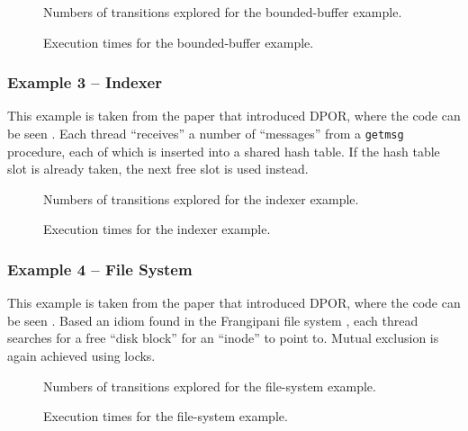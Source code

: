 \documentclass[12pt,a4paper,twoside,openright]{report}
\begin{document}
\begin{figure}
	\centering

	\def\svgwidth{\textwidth}
	
	\caption{Numbers of transitions explored
		for the bounded-buffer example.}
	\label{fig:prod-cons-time}
	\def\svgwidth{\textwidth}
	
	\caption{Execution times for the
		bounded-buffer example.}
	\label{fig:prod-cons-trans}
\end{figure}

\subsubsection{Example 3 -- Indexer}
This example is taken from
the paper that introduced DPOR,
where the code can be seen \cite[Figure~1]{flan05}.
Each thread ``receives'' a number of
``messages'' from a \texttt{getmsg}
procedure, each of which is inserted
into a shared hash table. If the
hash table slot is already taken, the
next free slot is used instead.

\begin{figure}
	\centering

	\def\svgwidth{\textwidth}
	
	\caption{Numbers of transitions explored
		for the indexer example.}
	\label{fig:indexer-trans}

	\def\svgwidth{\textwidth}
	
	\caption{Execution times
		for the indexer example.}
	\label{fig:indexer-time}
\end{figure}

\subsubsection{Example 4 -- File System}
This example is taken from
the paper that introduced DPOR,
where the code can be seen \cite[Figure~7]{flan05}.
Based an idiom found in the Frangipani file
system \cite{thek97}, each thread searches for a free
``disk block'' for an ``inode'' to point
to. Mutual exclusion is again achieved using
locks.

\begin{figure}
	\def\svgwidth{\textwidth}
	
	\caption{Numbers of transitions explored
		for the file-system example.}
	\label{fig:fs-trans}

	\def\svgwidth{\textwidth}
	
	\caption{Execution times
		for the file-system example.}
	\label{fig:fs-time}
\end{figure}
\end{document}
